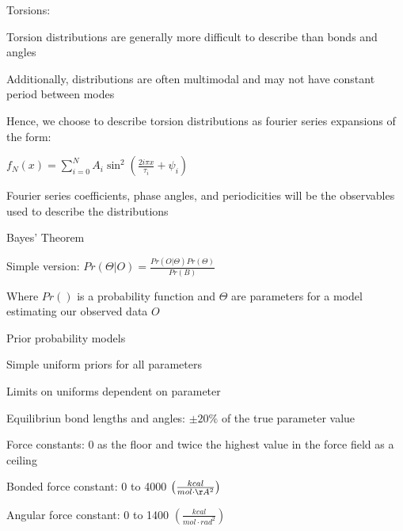 \documentclass{report}
\begin{document}
\begin{outline}
\begin{outline}
\begin{outline}
\begin{outline}
        \item{Torsions:}
        \begin{outline}
          \item{Torsion distributions are generally more difficult to describe than bonds and angles}
          \item{Additionally, distributions are often multimodal and may not have constant period between modes}
          \item{Hence, we choose to describe torsion distributions as fourier series expansions of the form:}
          \begin{outline}
            \item{$f_{N}\left(x\right) = \sum_{i=0}^N A_i \sin^2\left(\frac{2 i \pi x}{\tau_i} + \psi_i \right)$}
            \item{Fourier series coefficients, phase angles, and periodicities will be the observables used to describe the distributions}
          \end{outline}
        \end{outline}
      \end{outline}
      \item{Bayes' Theorem}
      \begin{outline}
        \item{Simple version: $Pr\left(\Theta|O\right) = \frac{Pr\left(O|\Theta\right)Pr\left(\Theta\right)}{Pr\left(B\right)}$}
        \item{Where $Pr\left(\right)$ is a probability function and $\Theta$ are parameters for a model estimating our observed data $O$}
      \end{outline}
      \item{Prior probability models}
      \begin{outline}
        \item{Simple uniform priors for all parameters}
        \item{Limits on uniforms dependent on parameter}
        \begin{outline}
          \item{Equilibriun bond lengths and angles: $\pm 20\%$ of the true parameter value}
          \item{Force constants: 0 as the floor and twice the highest value in the force field as a ceiling}
          \begin{outline}
            \item{Bonded force constant: 0 to 4000 $\left(\frac{kcal}{mol \cdot \AA^2}\right)$}
            \item{Angular force constant: 0 to 1400 $\left(\frac{kcal}{mol \cdot rad^2}\right)$}

\end{outline}
\end{outline}
\end{outline}
\end{outline}
\end{outline}
\end{outline}
\end{document}
